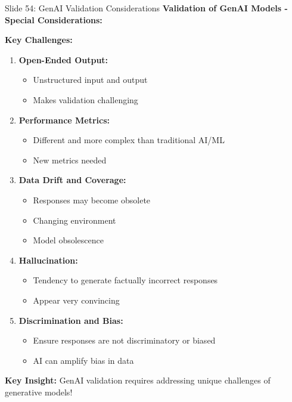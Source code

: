 \documentclass[8pt]{beamer}
\begin{document}
	\begin{frame}{Slide 54: GenAI Validation Considerations}
		\fontsize{6.5}{7.5}\selectfont
		\textbf{Validation of GenAI Models - Special Considerations:}
		
		\vspace{0.1cm}
		\textbf{Key Challenges:}
		\begin{enumerate}
			\item \textbf{Open-Ended Output:}
			\begin{itemize}
				\item Unstructured input and output
				\item Makes validation challenging
			\end{itemize}
			\item \textbf{Performance Metrics:}
			\begin{itemize}
				\item Different and more complex than traditional AI/ML
				\item New metrics needed
			\end{itemize}
			\item \textbf{Data Drift and Coverage:}
			\begin{itemize}
				\item Responses may become obsolete
				\item Changing environment
				\item Model obsolescence
			\end{itemize}
			\item \textbf{Hallucination:}
			\begin{itemize}
				\item Tendency to generate factually incorrect responses
				\item Appear very convincing
			\end{itemize}
			\item \textbf{Discrimination and Bias:}
			\begin{itemize}
				\item Ensure responses are not discriminatory or biased
				\item AI can amplify bias in data
			\end{itemize}
		\end{enumerate}
		
		\textcolor{myblue}{\textbf{Key Insight:}} GenAI validation requires \textcolor{myblue}{addressing unique challenges of generative models}!
	\end{frame}
	
\end{document}
